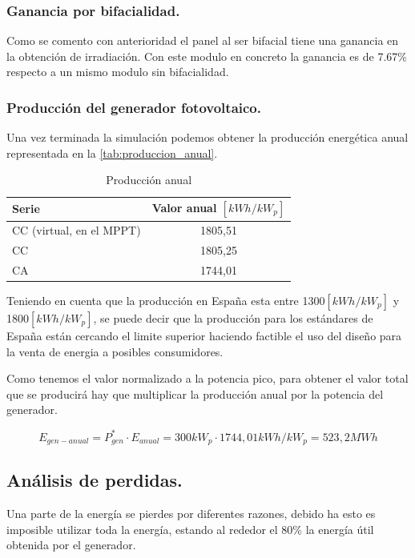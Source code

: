 \documentclass[12pt]{article}
\begin{document}
\subsubsection{Ganancia por bifacialidad.}
Como se comento con anterioridad el panel al ser bifacial tiene una ganancia en la obtención de irradiación.
Con este modulo en concreto la ganancia es de 7.67\% respecto a un mismo modulo sin bifacialidad.

\subsubsection{Producción del generador fotovoltaico.}

Una vez terminada la simulación podemos obtener la producción energética anual representada en la \autoref{tab:produccion_anual}.

\begin{table}[h]
	\centering
	\caption{Producción anual}
	\label{tab:produccion_anual}
	\begin{tabular}{l c}
		\toprule
		Serie & Valor anual $[kWh/kW_p]$ \\
		\midrule
		CC (virtual, en el MPPT) & 1805,51 \\
		CC & 1805,25 \\
		CA & 1744,01 \\
		\bottomrule
	\end{tabular}
\end{table}

Teniendo en cuenta que la producción en España esta entre 1300$[kWh/kW_p]$ y 1800$[kWh/kW_p]$, se puede decir que la producción para los estándares de España están cercando el limite superior haciendo factible el uso del diseño para la venta de energia a posibles consumidores.

Como tenemos el valor normalizado a la potencia pico, para obtener el valor total que se producirá hay que multiplicar la producción anual por la potencia del generador.

\begin{equation}
	E_{gen-anual}=P^*_{gen}\cdot E_{anual}=300kW_p\cdot 1744,01kWh/kW_p=523,2MWh
\end{equation}

\subsection{Análisis de perdidas.}
Una parte de la energía se pierdes por diferentes razones, debido ha esto es imposible utilizar toda la energía, estando al rededor el 80\% la energía útil obtenida por el generador.
\end{document}
